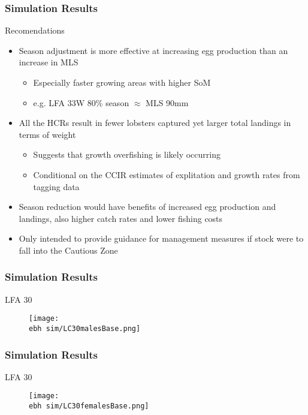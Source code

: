 \documentclass{beamer}
\newcommand{\ebh}{\string~/bio.data/bio.lobster/figures/LFA2733Framework2018/} %
\begin{document}
\begin{frame}
\frametitle{Simulation Results}
Recomendations
\begin{itemize}
\item Season adjustment is more effective at increasing egg production than an increase in MLS
\begin{itemize}
\item Especially faster growing areas with higher SoM 
\item e.g. LFA 33W 80\% season $\approx$ MLS 90mm
\end{itemize}
\item All the HCRs result in fewer lobsters captured yet larger total landings in terms of weight
\begin{itemize}
\item Suggests that growth overfishing is likely occurring
\item Conditional on the CCIR estimates of explitation and growth rates from tagging data
\end{itemize}
\item Season reduction would have benefits of increased egg production and landings, also higher catch rates and lower fishing costs
\item Only intended to provide guidance for management measures if stock were to fall into the Cautious Zone
\end{itemize}
\end{frame}











\begin{frame}
\frametitle{Simulation Results}
LFA 30 
\begin{figure}
        \begin{center}
            \texttt{[image: \\ebh sim/LC30malesBase.png]}
        \end{center}
    \end{figure}
\end{frame}


\begin{frame}
\frametitle{Simulation Results}
LFA 30 
\begin{figure}
        \begin{center}
            \texttt{[image: \\ebh sim/LC30femalesBase.png]}
        \end{center}
    \end{figure}
\end{frame}
\end{document}
